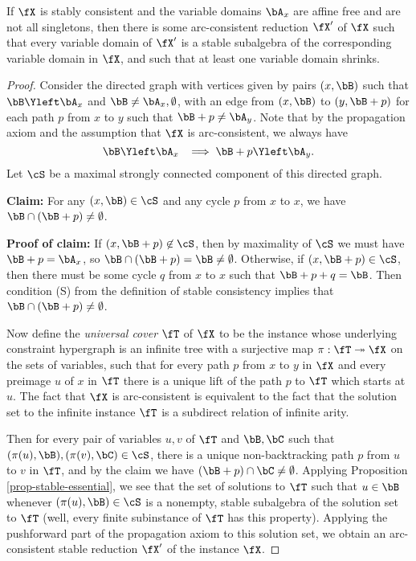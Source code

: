 \begin{lem} If $\fX$ is stably consistent and the variable domains $\bA_x$ are affine free and are not all singletons, then there is some arc-consistent reduction $\fX'$ of $\fX$ such that every variable domain of $\fX'$ is a stable subalgebra of the corresponding variable domain in $\fX$, and such that at least one variable domain shrinks.
\end{lem}
\begin{proof} Consider the directed graph with vertices given by pairs $(x,\bB)$ such that $\bB \Yleft \bA_x$ and $\bB \ne \bA_x, \emptyset$, with an edge from $(x,\bB)$ to $(y,\bB + p)$ for each path $p$ from $x$ to $y$ such that $\bB + p \ne \bA_y$. Note that by the propagation axiom and the assumption that $\fX$ is arc-consistent, we always have
\[
\bB \Yleft \bA_x \;\; \implies \bB + p \Yleft \bA_y.
\]
Let $\cS$ be a maximal strongly connected component of this directed graph.

{\bf Claim:} For any $(x,\bB) \in \cS$ and any cycle $p$ from $x$ to $x$, we have $\bB \cap (\bB + p) \ne \emptyset$.

{\bf Proof of claim:} If $(x, \bB+p) \not\in \cS$, then by maximality of $\cS$ we must have $\bB + p = \bA_x$, so $\bB \cap (\bB+p) = \bB \ne \emptyset$. Otherwise, if $(x, \bB+p) \in \cS$, then there must be some cycle $q$ from $x$ to $x$ such that $\bB + p + q =\bB$. Then condition (S) from the definition of stable consistency implies that $\bB \cap (\bB + p) \ne \emptyset$.

Now define the \emph{universal cover} $\fT$ of $\fX$ to be the instance whose underlying constraint hypergraph is an infinite tree with a surjective map $\pi : \fT \twoheadrightarrow \fX$ on the sets of variables, such that for every path $p$ from $x$ to $y$ in $\fX$ and every preimage $u$ of $x$ in $\fT$ there is a unique lift of the path $p$ to $\fT$ which starts at $u$. The fact that $\fX$ is arc-consistent is equivalent to the fact that the solution set to the infinite instance $\fT$ is a subdirect relation of infinite arity.

Then for every pair of variables $u,v$ of $\fT$ and $\bB, \bC$ such that $(\pi(u), \bB), (\pi(v), \bC) \in \cS$, there is a unique non-backtracking path $p$ from $u$ to $v$ in $\fT$, and by the claim we have $(\bB + p) \cap \bC \ne \emptyset$. Applying Proposition \ref{prop-stable-essential}, we see that the set of solutions to $\fT$ such that $u \in \bB$ whenever $(\pi(u), \bB) \in \cS$ is a nonempty, stable subalgebra of the solution set to $\fT$ (well, every finite subinstance of $\fT$ has this property). Applying the pushforward part of the propagation axiom to this solution set, we obtain an arc-consistent stable reduction $\fX'$ of the instance $\fX$.
\end{proof}

